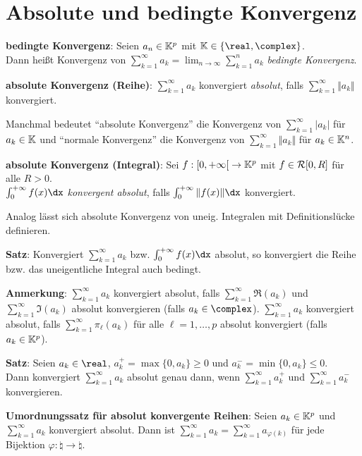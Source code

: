 \section{%
    Absolute und bedingte Konvergenz%
}

\textbf{bedingte Konvergenz}: Seien $a_n \in \mathbb{K}^p$ mit
$\field \in \{\real, \complex\}$. \\
Dann heißt Konvergenz von
$\sum_{k=1}^\infty a_k = \lim_{n \to \infty} \sum_{k=1}^n a_k$
\emph{bedingte Konvergenz}.

\textbf{absolute Konvergenz (Reihe)}:
$\sum_{k=1}^\infty a_k$ konvergiert \emph{absolut}, falls
$\sum_{k=1}^\infty \Vert a_k \Vert$ konvergiert.

Manchmal bedeutet "`absolute Konvergenz"' die Konvergenz von
$\sum_{k=1}^\infty |a_k|$ für $a_k \in \mathbb{K}$
und "`normale Konvergenz"' die Konvergenz von
$\sum_{k=1}^\infty \Vert a_k \Vert$ für $a_k \in \mathbb{K}^n$.

\textbf{absolute Konvergenz (Integral)}:
Sei $f: \left[0,+\infty\right[ \rightarrow \mathbb{K}^p$ mit $f \in \mathcal{R}[0,R]$
für alle $R > 0$. \\
$\int_0^{+\infty} f(x)\dx$ \emph{konvergent absolut}, falls
$\int_0^{+\infty} \Vert f(x) \Vert \dx$ konvergiert.

Analog lässt sich absolute Konvergenz von uneig. Integralen mit
Definitionslücke definieren.

\linie

\textbf{Satz}: Konvergiert $\sum_{k=1}^\infty a_k$ bzw.
$\int_0^{+\infty} f(x)\dx$ absolut, so konvergiert die Reihe bzw.
das uneigentliche Integral auch bedingt.

\textbf{Anmerkung}:
$\sum_{k=1}^\infty a_k$ konvergiert absolut, falls
$\sum_{k=1}^\infty \Re(a_k)$ und $\sum_{k=1}^\infty \Im(a_k)$ absolut
konvergieren (falls $a_k \in \complex$).
$\sum_{k=1}^\infty a_k$ konvergiert absolut, falls
$\sum_{k=1}^\infty \pi_\ell(a_k)$ für alle $\ell = 1, \dotsc, p$ absolut
konvergiert (falls $a_k \in \mathbb{K}^p$).

\linie

\textbf{Satz}:
Seien $a_k \in \real$, $a_k^+ = \max\{0, a_k\} \ge 0$ und
$a_k^- = \min\{0, a_k\} \le 0$. \\
Dann konvergiert $\sum_{k=1}^\infty a_k$ absolut genau dann, wenn
$\sum_{k=1}^\infty a_k^+$ und $\sum_{k=1}^\infty a_k^-$ konvergieren.

\textbf{Umordnungssatz für absolut konvergente Reihen}:
Seien $a_k \in \mathbb{K}^p$ und $\sum_{k=1}^\infty a_k$ konvergiert absolut.
Dann ist $\sum_{k=1}^\infty a_k = \sum_{k=1}^\infty a_{\varphi(k)}$
für jede Bijektion $\varphi: \natural \rightarrow \natural$.

